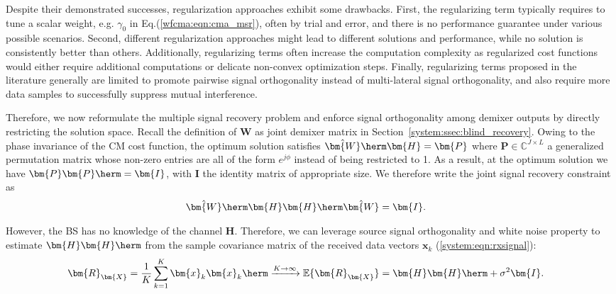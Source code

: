 Despite their demonstrated successes, regularization approaches exhibit some drawbacks. 
First, the regularizing term typically requires to tune a scalar weight, e.g. $\gamma_0$ in Eq.(\ref{wfcma:eqn:cma_msr}), often by trial and error, and there is no performance guarantee under various possible scenarios.
Second, different regularization approaches might lead to different solutions and performance, while no solution is consistently better than others. 
Additionally, regularizing terms often increase the computation complexity as regularized cost functions would either require additional computations or delicate non-convex optimization steps. 
Finally, regularizing terms proposed in the literature generally are limited to promote pairwise signal orthogonality instead of multi-lateral signal orthogonality, and also require more data samples to successfully suppress mutual interference.

Therefore, we now reformulate the multiple signal recovery problem and enforce signal orthogonality among demixer outputs by directly restricting the solution space.
Recall the definition of $\bm{W}$ as joint demixer matrix in Section~\ref{system:ssec:blind_recovery}. 
Owing to the phase invariance of the CM cost function, the optimum solution satisfies $\hat{\bm{W}}\herm\bm{H}=\bm{P}$ where $\bm{P}\in\mathbb{C}^{J\times L}$ a generalized permutation matrix whose non-zero entries are
all of the form $e^{j\phi}$ instead of being restricted to 1. 
As a result, at the optimum solution we have $\bm{P}\bm{P}\herm=\bm{I}$, with $\bm{I}$ the identity matrix of appropriate size.
We therefore write the joint signal recovery constraint as
\begin{align}
\hat{\bm{W}}\herm\bm{H}\bm{H}\herm\hat{\bm{W}} &=\bm{I}.
\end{align}

However, the BS has no knowledge of the channel $\bm{H}$. 
Therefore, we can leverage source signal orthogonality and white noise property to estimate $\bm{H}\bm{H}\herm$ from the sample covariance matrix of the received data vectors $\bm{x}_k$ (\ref{system:eqn:rxsignal}):
\begin{align}
\bm{R}_{\bm{X}} &= \frac{1}{K}\sum_{k=1}^K \bm{x}_k\bm{x}_k\herm 
\xrightarrow{K\to\infty} \mathbb{E}\{\bm{R}_{\bm{X}}\}= \bm{H}\bm{H}\herm + \sigma^2\bm{I}.
\end{align}

